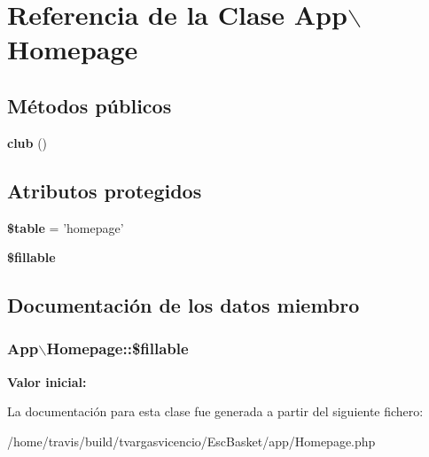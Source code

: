 \hypertarget{class_app_1_1_homepage}{\section{\-Referencia de la \-Clase \-App$\backslash$\-Homepage}
\label{class_app_1_1_homepage}
}
\subsection*{\-Métodos públicos}
\begin{DoxyCompactItemize}
\item 
\hypertarget{class_app_1_1_homepage_a6f6296b49d037998fa320a116c218696}{{\bfseries club} ()}\label{class_app_1_1_homepage_a6f6296b49d037998fa320a116c218696}

\end{DoxyCompactItemize}
\subsection*{\-Atributos protegidos}
\begin{DoxyCompactItemize}
\item 
\hypertarget{class_app_1_1_homepage_a15778b5cb6fcf53f51222c58e36e7378}{{\bfseries \$table} = 'homepage'}\label{class_app_1_1_homepage_a15778b5cb6fcf53f51222c58e36e7378}

\item 
{\bfseries \$fillable}
\end{DoxyCompactItemize}


\subsection{\-Documentación de los datos miembro}
\hypertarget{class_app_1_1_homepage_a4f1249df4846976ef5adb20eb32c5341}{
\subsubsection[{\$fillable}]{\setlength{\rightskip}{0pt plus 5cm}\-App$\backslash$\-Homepage\-::\$fillable}}\label{class_app_1_1_homepage_a4f1249df4846976ef5adb20eb32c5341}
{\bfseries \-Valor inicial\-:}
\begin{DoxyCode}
\end{DoxyCode}


\-La documentación para esta clase fue generada a partir del siguiente fichero\-:\begin{DoxyCompactItemize}
\item 
/home/travis/build/tvargasvicencio/\-Esc\-Basket/app/\-Homepage.\-php\end{DoxyCompactItemize}
